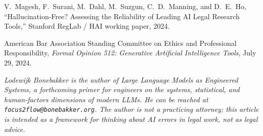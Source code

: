 \documentclass[11pt,a4paper]{article}
\begin{document}
\noindent
[2] V.~Magesh, F.~Surani, M.~Dahl, M.~Suzgun, C.~D.~Manning, and
D.~E.~Ho, ``Hallucination-Free? Assessing the Reliability of
Leading AI Legal Research Tools,'' Stanford RegLab / HAI working
paper, 2024.

\noindent
[3] American Bar Association Standing Committee on Ethics and
Professional Responsibility, \emph{Formal Opinion 512: Generative
Artificial Intelligence Tools}, July 29, 2024.

\bigskip

\noindent
\textit{Lodewijk Bonebakker is the author of \emph{Large Language
Models as Engineered Systems}, a forthcoming primer for engineers
on the systems, statistical, and human-factors dimensions of
modern LLMs. He can be reached at
\texttt{focus2flow@bonebakker.org}. The author is not a practicing
attorney; this article is intended as a framework for thinking
about AI errors in legal work, not as legal advice.}
\end{document}
